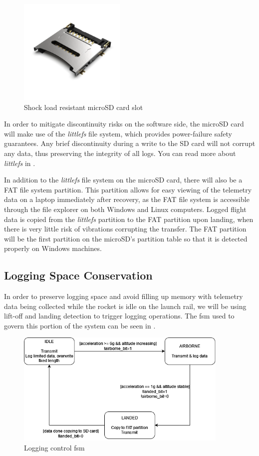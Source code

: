 \begin{figure}[H]
    \centering
    \includegraphics[width=2in]{./assets/images/sd-card-cage.png}
    \caption{Shock load resistant microSD card slot \cite{sd-card-cage}}
    \label{fig:sd-card-cage}
\end{figure}

In order to mitigate discontinuity risks on the software side, the microSD card will make use of the \textit{littlefs}
file system, which provides power-failure safety guarantees. Any brief discontinuity during a write to the SD card will
not corrupt any data, thus preserving the integrity of all logs. You can read more about \textit{littlefs} in
.

In addition to the \textit{littlefs} file system on the microSD card, there will also be a FAT file system partition.
This partition allows for easy viewing of the telemetry data on a laptop immediately after recovery, as the FAT file
system is accessible through the file explorer on both Windows and Linux computers. Logged flight data is copied from
the \textit{littlefs} partition to the FAT partition upon landing, when there is very little risk of vibrations
corrupting the transfer. The FAT partition will be the first partition on the microSD's partition table so that it is
detected properly on Windows machines.

\subsection{Logging Space Conservation}

In order to preserve logging space and avoid filling up memory with telemetry data being collected while the rocket is
idle on the launch rail, we will be using lift-off and landing detection to trigger logging operations. The \gls{fsm}
used to govern this portion of the system can be seen in .

\begin{figure}[H]
    \centering
    \includegraphics[width=4in]{./assets/diagrams/Flight State FSM.png}
    \caption{Logging control \gls{fsm}}
    \label{fig:logging-fsm}
\end{figure}

